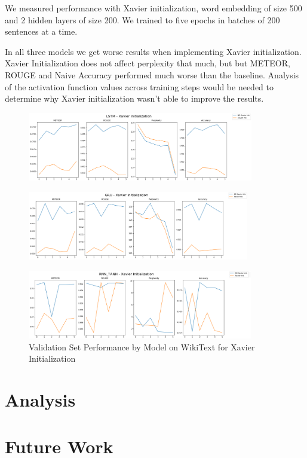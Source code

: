 \documentclass[a4paper]{article}
\begin{document}
We measured performance with Xavier initialization, word embedding of size 500 and 2 hidden layers of size 200.
We trained to five epochs in batches of 200 sentences at a time.
 
In all three models we get worse results when implementing Xavier initialization. Xavier Initialization does not
affect perplexity that much, but but METEOR, ROUGE and Naive Accuracy performed much worse than the baseline.
Analysis of the activation function values across training steps would be needed to determine why Xavier
initialization wasn't able to improve the results.

\begin{figure}[!ht]
\includegraphics[width=\textwidth, height=3cm]{lstm-xi}
\centering
\end{figure}
\begin{figure}[!ht]
\includegraphics[width=\textwidth, height=3cm]{gru-xi}
\centering
\end{figure}
\begin{figure}[!ht]
\includegraphics[width=\textwidth, height=3cm]{tanh-xi}
\centering
\caption{Validation Set Performance by Model on WikiText for Xavier Initialization}
\end{figure}


\section{Analysis}
\label{sec:analysis}

\section{Future Work}
\label{sec:future}
\end{document}
